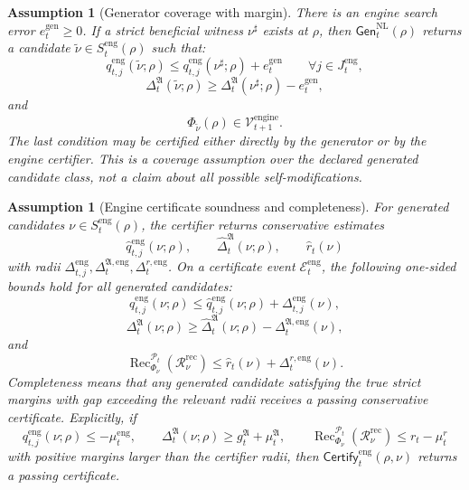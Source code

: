 \documentclass[11pt]{article}
\newtheorem{assumption}[theorem]{Assumption}
\newcommand{\Pcal}{\mathcal{P}}
\newcommand{\Ecal}{\mathcal{E}}
\newcommand{\Rcal}{\mathcal{R}}
\newcommand{\1}{\mathbf{1}}
\providecommand{\Vcal}{\mathcal{V}}
\providecommand{\Rec}{\operatorname{Rec}}
\begin{document}
\begin{assumption}[Generator coverage with margin]
\label{ass:generator_coverage_with_margin}
There is an engine search error \(e_t^{\mathrm{gen}}\ge0\).  If a strict beneficial witness \(\nu^\sharp\) exists at \(\rho\), then \(\mathsf{Gen}_t^{\mathrm{NL}}(\rho)\) returns a candidate \(\widetilde\nu\in S_t^{\mathrm{eng}}(\rho)\) such that:
\[
q_{t,j}^{\mathrm{eng}}(\widetilde\nu;\rho)
\le
q_{t,j}^{\mathrm{eng}}(\nu^\sharp;\rho)+e_t^{\mathrm{gen}}
\qquad\forall j\in J_t^{\mathrm{eng}},
\]
\[
\Delta_t^{\mathfrak A}(\widetilde\nu;\rho)
\ge
\Delta_t^{\mathfrak A}(\nu^\sharp;\rho)-e_t^{\mathrm{gen}},
\]
and
\[
\Phi_{\widetilde\nu}(\rho)\in\Vcal_{t+1}^{\mathrm{engine}}.
\]
The last condition may be certified either directly by the generator or by the engine certifier.  This is a coverage assumption over the declared generated candidate class, not a claim about all possible self-modifications.
\end{assumption}

\begin{assumption}[Engine certificate soundness and completeness]
\label{ass:engine_certificate_soundness_completeness}
For generated candidates \(\nu\in S_t^{\mathrm{eng}}(\rho)\), the certifier returns conservative estimates
\[
\widehat q_{t,j}^{\mathrm{eng}}(\nu;\rho),
\qquad
\widehat\Delta_t^{\mathfrak A}(\nu;\rho),
\qquad
\widehat r_t(\nu)
\]
with radii \(\Delta_{t,j}^{\mathrm{eng}},\Delta_t^{\mathfrak A,\mathrm{eng}},\Delta_t^{r,\mathrm{eng}}\).  On a certificate event \(\Ecal_t^{\mathrm{eng}}\), the following one-sided bounds hold for all generated candidates:
\[
q_{t,j}^{\mathrm{eng}}(\nu;\rho)
\le
\widehat q_{t,j}^{\mathrm{eng}}(\nu;\rho)+\Delta_{t,j}^{\mathrm{eng}}(\nu),
\]
\[
\Delta_t^{\mathfrak A}(\nu;\rho)
\ge
\widehat\Delta_t^{\mathfrak A}(\nu;\rho)-\Delta_t^{\mathfrak A,\mathrm{eng}}(\nu),
\]
and
\[
\Rec_{\Phi_\nu}^{\Pcal_t}(\Rcal_\nu^{\mathrm{rec}})
\le
\widehat r_t(\nu)+\Delta_t^{r,\mathrm{eng}}(\nu).
\]
Completeness means that any generated candidate satisfying the true strict margins with gap exceeding the relevant radii receives a passing conservative certificate.  Explicitly, if
\[
q_{t,j}^{\mathrm{eng}}(\nu;\rho)\le -\mu_t^{\mathrm{eng}},
\qquad
\Delta_t^{\mathfrak A}(\nu;\rho)\ge g_t^{\mathfrak A}+\mu_t^{\mathfrak A},
\qquad
\Rec_{\Phi_\nu}^{\Pcal_t}(\Rcal_\nu^{\mathrm{rec}})\le r_t-\mu_t^r
\]
with positive margins larger than the certifier radii, then \(\mathsf{Certify}_t^{\mathrm{eng}}(\rho,\nu)\) returns a passing certificate.
\end{assumption}
\end{document}
